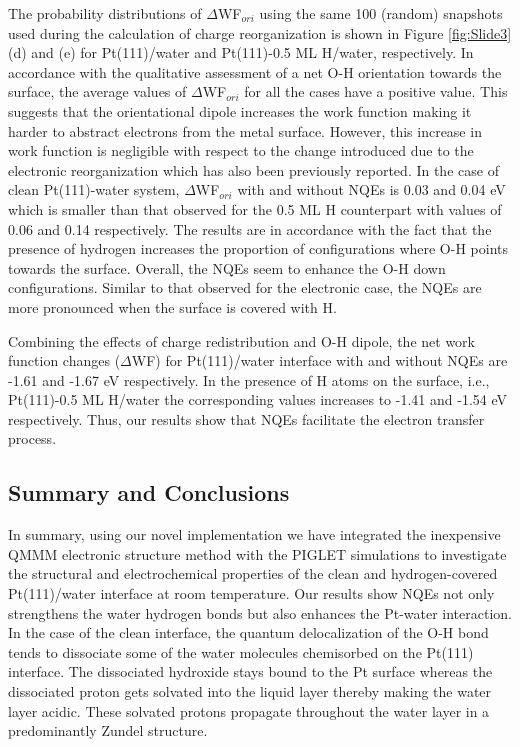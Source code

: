 The probability distributions of $\Delta$WF$_{ori}$ using the same 100 (random) snapshots used during the calculation of charge reorganization is shown in Figure \ref{fig:Slide3}(d) and (e) for Pt(111)/water and Pt(111)-0.5 ML H/water, respectively. In accordance with the qualitative assessment of a net O-H orientation towards the surface, the average values of $\Delta$WF$_{ori}$ for all the cases have a positive value. This suggests that the orientational dipole increases the work function making it harder to abstract electrons from the metal surface. However, this increase in work function is negligible with respect to the change introduced due to the electronic reorganization which has also been previously reported\cite{le2017determining,li2021establishment,sakong2018electric}. In the case of clean Pt(111)-water system, $\Delta$WF$_{ori}$ with and without NQEs is 0.03 and 0.04 eV which is smaller than that observed for the 0.5 ML H counterpart with values of 0.06 and 0.14 respectively. The results are in accordance with the fact that the presence of hydrogen increases the proportion of configurations where O-H points towards the surface. Overall, the NQEs seem to enhance the O-H down configurations. Similar to that observed for the electronic case, the NQEs are more pronounced when the surface is covered with H.

Combining the effects of charge redistribution and O-H dipole, the net work function changes ($\Delta$WF) for Pt(111)/water interface with and without NQEs are -1.61 and -1.67 eV respectively. In the presence of H atoms on the surface, i.e., Pt(111)-0.5 ML H/water the corresponding values increases to -1.41 and -1.54 eV respectively. Thus, our results show that NQEs facilitate the electron transfer process.


\subsection{Summary and Conclusions}
In summary, using our novel implementation we have integrated the inexpensive QMMM electronic structure method with the PIGLET simulations to investigate the structural and electrochemical properties of the clean and hydrogen-covered Pt(111)/water interface at room temperature. Our results show NQEs not only strengthens the water hydrogen bonds but also enhances the Pt-water interaction. In the case of the clean interface, the quantum delocalization of the O-H bond tends to dissociate some of the water molecules chemisorbed on the Pt(111) interface. The dissociated hydroxide stays bound to the Pt surface whereas the dissociated proton gets solvated into the liquid layer thereby making the water layer acidic. These solvated protons propagate throughout the water layer in a predominantly Zundel structure. 

